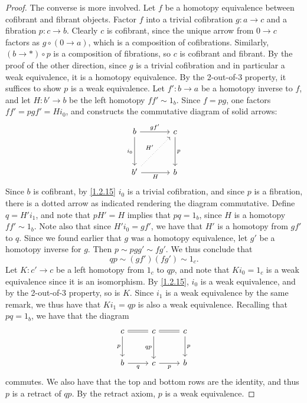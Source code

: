 \begin{proof}
	The converse is more involved. Let $f$ be a homotopy equivalence between cofibrant and fibrant objects. Factor $f$ into a trivial cofibration $g : a \to c$ and a fibration $p : c \to b$. Clearly $c$ is cofibrant, since the unique arrow from $0\to c$ factors as $g\circ (0\to a)$, which is a composition of cofibrations. Similarly, $(b\to *)\circ p$ is a composition of fibrations, so $c$ is cofibrant and fibrant. By the proof of the other direction, since $g$ is a trivial cofibration and in particular a weak equivalence, it is a homotopy equivalence. By the 2-out-of-3 property, it suffices to show $p$ is a weak equivalence. Let $f': b \to a$ be a homotopy inverse to $f$, and let $H : b' \to b$ be the left homotopy $ff' \sim 1_b$. Since $f=pg$, one factors $ff'=pgf'=Hi_0$, and constructs the commutative diagram of solid arrows:
	\[\begin{tikzcd}[row sep = 3.5em, column sep = 3.5em]
	b \ar[" gf' ", r] \ar[" i_0 "', d]  & c \ar[" p ", d]  \\
	b' \ar[" H "', r] \ar[" H' ", dotted, ur] & b
	\end{tikzcd}\]
	Since $b$ is cofibrant, by \cref{1.2.15} $i_0$ is a trivial cofibration, and since $p$ is a fibration, there is a dotted arrow as indicated rendering the diagram commutative. Define $q=H'i_1$, and note that $pH'=H$ implies that $pq=1_b$, since $H$ is a homotopy $ff'\sim 1_b$. Note also that since $H'i_0=gf'$, we have that $H'$ is a homotopy from $gf'$ to $q$. Since we found earlier that $g$ was a homotopy equivalence, let $g'$ be a homotopy inverse for $g$. Then $p\sim pgg'\sim fg'$. We thus conclude that
	\[
		qp\sim (gf')(fg')\sim 1_c
	.\]
	Let $K : c' \to c$ be a left homotopy from $1_c$ to $qp$, and note that $Ki_0=1_c$ is a weak equivalence since it is an isomorphism. By \cref{1.2.15}, $i_0$ is a weak equivalence, and by the 2-out-of-3 property, so is $K$. Since $i_1$ is a weak equivalence by the same remark, we thus have that $Ki_1=qp$ is also a weak equivalence. Recalling that $pq=1_b$, we have that the diagram
	\[\begin{tikzcd}[row sep = 2.5em, column sep = 2.5em]
	c \ar[equals, r] \ar[" p "', d]  & c \ar[equals, r] \ar[" qp "', d]  & c\ar[" p ", d]  \\
	b \ar[" q "', r]  & c \ar[" p "', r]  & b
	\end{tikzcd}\]
	commutes. We also have that the top and bottom rows are the identity, and thus $p$ is a retract of $qp$. By the retract axiom, $p$ is a weak equivalence.
\end{proof}

